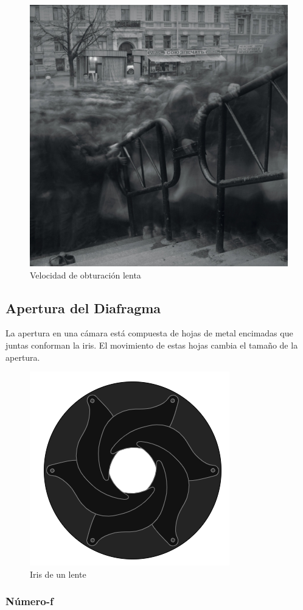 \documentclass{article}
\begin{document}
\begin{figure}[H]
	\centering
	\includegraphics[width=0.80\linewidth]{Figuras/Shutter_Speed_7}
	\caption{Velocidad de obturación lenta}
	\label{fig:shutterspeed7}
\end{figure}



\subsection{Apertura del Diafragma}

La apertura en una cámara está compuesta de hojas de metal encimadas que juntas conforman la iris. El movimiento de estas hojas cambia el tamaño de la apertura.

\begin{figure}[H]
	\centering
	\includegraphics[width=0.35\linewidth]{Figuras/Iris}
	\caption{Iris de un lente}
	\label{fig:iris}
\end{figure}


\subsubsection{Número-f}
\end{document}
